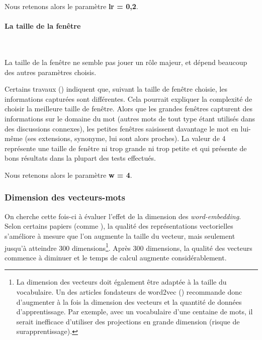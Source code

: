 \documentclass[11pt,french,french]{article}
\let\rmarkdownfootnote\footnote%
\def\footnote{\protect\rmarkdownfootnote}
\begin{document}
\faArrowCircleRight{} Nous retenons alors le paramètre \textbf{lr = 0,2}.

\hypertarget{la-taille-de-la-fenuxeatre}{%
\paragraph{La taille de la fenêtre}\label{la-taille-de-la-fenuxeatre}}

~

La taille de la fenêtre ne semble pas jouer un rôle majeur, et dépend beaucoup des autres paramètres choisis.

Certains travaux (\cite{Levy2}) indiquent que, suivant la taille de fenêtre choisie, les informations capturées sont différentes. Cela pourrait expliquer la complexité de choisir la \og meilleure \fg{} taille de fenêtre. Alors que les \og grandes \fg{} fenêtres capturent des informations sur le domaine du mot (autres mots de tout type étant utilisés dans des discussions connexes), les \og petites \fg{} fenêtres saisissent davantage le mot en lui-même (ses extensions, synonyme, lui sont alors proches). La valeur de 4 représente une taille de fenêtre \og ni trop grande ni trop petite\fg{} et qui présente de bons résultats dans la plupart des tests effectués.

\faArrowCircleRight{} Nous retenons alors le paramètre \textbf{w = 4}.

\hypertarget{dimension-des-vecteurs-mots}{%
\subsubsection{Dimension des vecteurs-mots}\label{dimension-des-vecteurs-mots}}

On cherche cette fois-ci à évaluer l'effet de la dimension des \emph{word-embedding}. Selon certains papiers (comme \cite{Pennington}), la qualité des représentations vectorielles s'améliore à mesure que l'on augmente la taille du vecteur, mais seulement jusqu'à atteindre 300 dimensions\footnote{La dimension des vecteurs doit également être adaptée à la taille du vocabulaire. Un des articles fondateurs de word2vec (\cite{Mikolov}) recommande donc d'augmenter à la fois la dimension des vecteurs et la quantité de données d'apprentissage. Par exemple, avec un vocabulaire d'une centaine de mots, il serait inefficace d'utiliser des projections en grande dimension (risque de surapprentissage).}. Après 300 dimensions, la qualité des vecteurs commence à diminuer et le temps de calcul augmente considérablement.
\end{document}

